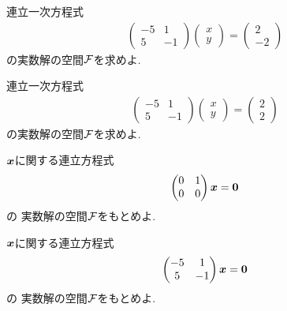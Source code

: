 \begin{quiz}
  \label{quiz:3:3}
  連立一次方程式
  \begin{align*}
    \begin{pmatrix}-5&1\\5&-1\end{pmatrix}
    \begin{pmatrix}x\\y\end{pmatrix}
      =
      \begin{pmatrix}2\\-2\end{pmatrix}
  \end{align*}
  の実数解の空間$\mathcal{F}$を求めよ.
\end{quiz}

\begin{quiz}
  \label{quiz:3:3x}

  連立一次方程式
  \begin{align*}
    \begin{pmatrix}-5&1\\5&-1\end{pmatrix}
    \begin{pmatrix}x\\y\end{pmatrix}
      =
      \begin{pmatrix}2\\2\end{pmatrix}
  \end{align*}
  の実数解の空間$\mathcal{F}$を求めよ.
\end{quiz}


\begin{quiz}
  \label{quiz:3:8}
  $\boldsymbol{x}$に関する連立方程式
  \begin{align*}
    \begin{pmatrix}0&1\\0&0\end{pmatrix}
      \boldsymbol{x}
      =\boldsymbol{0}
  \end{align*}
  の
  実数解の空間$\mathcal{F}$をもとめよ.
\end{quiz}

\begin{quiz}
  \label{quiz:3:9}
  $\boldsymbol{x}$に関する連立方程式
  \begin{align*}
    \begin{pmatrix}-5&1\\5&-1\end{pmatrix}
      \boldsymbol{x}
      =\boldsymbol{0}
  \end{align*}
  の
  実数解の空間$\mathcal{F}$をもとめよ.
\end{quiz}

